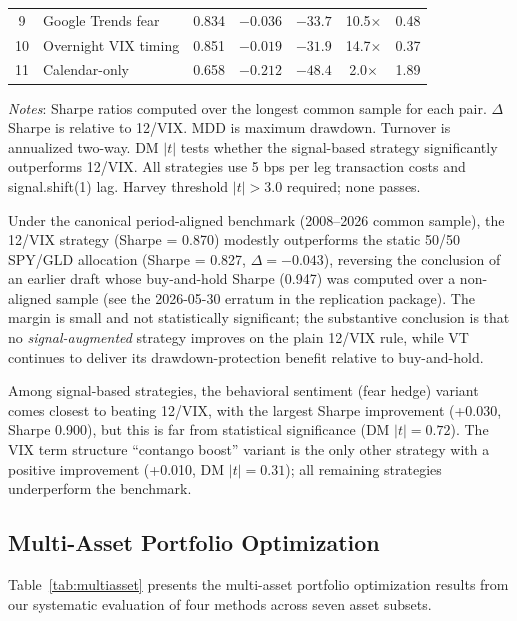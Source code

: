 \documentclass[12pt,a4paper]{article}
\begin{document}
\begin{table}[H]
\begin{threeparttable}
\begin{tabular}{@{}clccccc@{}}
9 & Google Trends fear & 0.834 & $-0.036$ & $-33.7$ & 10.5$\times$ & 0.48 \\
10 & Overnight VIX timing & 0.851 & $-0.019$ & $-31.9$ & 14.7$\times$ & 0.37 \\
11 & Calendar-only & 0.658 & $-0.212$ & $-48.4$ & 2.0$\times$ & 1.89 \\
\bottomrule
\end{tabular}
\begin{tablenotes}
\small
\item \textit{Notes}: Sharpe ratios computed over the longest common sample for each pair. $\Delta$Sharpe is relative to 12/VIX. MDD is maximum drawdown. Turnover is annualized two-way. DM $|t|$ tests whether the signal-based strategy significantly outperforms 12/VIX. All strategies use 5 bps per leg transaction costs and signal.shift(1) lag. Harvey threshold $|t|>3.0$ required; none passes.
\end{tablenotes}
\end{threeparttable}
\end{table}

Under the canonical period-aligned benchmark (2008--2026 common sample), the 12/VIX strategy (Sharpe = 0.870) modestly outperforms the static 50/50 SPY/GLD allocation (Sharpe = 0.827, $\Delta = -0.043$), reversing the conclusion of an earlier draft whose buy-and-hold Sharpe (0.947) was computed over a non-aligned sample (see the 2026-05-30 erratum in the replication package). The margin is small and not statistically significant; the substantive conclusion is that no \emph{signal-augmented} strategy improves on the plain 12/VIX rule, while VT continues to deliver its drawdown-protection benefit relative to buy-and-hold.

Among signal-based strategies, the behavioral sentiment (fear hedge) variant comes closest to beating 12/VIX, with the largest Sharpe improvement (+0.030, Sharpe 0.900), but this is far from statistical significance (DM $|t| = 0.72$). The VIX term structure ``contango boost'' variant is the only other strategy with a positive improvement (+0.010, DM $|t| = 0.31$); all remaining strategies underperform the benchmark.

\subsection{Multi-Asset Portfolio Optimization}

Table~\ref{tab:multiasset} presents the multi-asset portfolio optimization results from our systematic evaluation of four methods across seven asset subsets.
\end{document}
